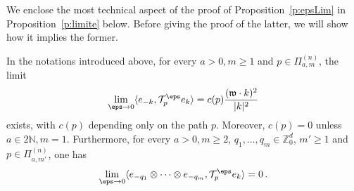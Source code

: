 \documentclass[reqno,11pt]{preprint}
\renewcommand{\N}{\mathbb{N}}
\newcommand{\fw}{\mathfrak{w}}
\newcommand{\1}{\mathds{1}}
\begin{document}
We enclose the most technical aspect of the proof of Proposition~\ref{p:epsLim} 
in Proposition~\ref{p:limite} below. Before giving the proof of the latter, 
we will show how it implies the former. 

\begin{proposition}
  \label{p:limite}
In the notations introduced above, for every $a>0,m\ge1$ and $p\in \Pi^{(n)}_{a,m}$, the limit
\begin{equation}
  \label{e:cp}
  \lim_{\eps\to0} \langle e_{-k},\mathcal T^\eps_pe_k\rangle= c(p)\frac{(\fw\cdot k)^2}{|k|^2}
\end{equation}
exists, with $c(p)$ depending only on the path $p$.  Moreover, $c(p)=0$ unless $a\in 2\N, m=1$. 
Furthermore, for every $a>0, m\ge2$, $q_1,\dots,q_m\in \mathbb Z^d_0$, $m'\geq 1$ and 
$p\in \Pi^{(n)}_{a,m'}$, one has
\begin{equation}
\label{e:nullo}  \lim_{\eps\to0} \langle e_{-q_1}\otimes\dots\otimes e_{-q_m},\mathcal T^\eps_p e_k\rangle= 0\,.
\end{equation}
\end{proposition}
\end{document}
